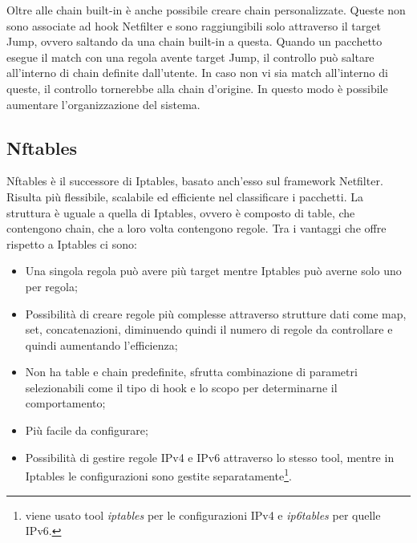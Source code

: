 Oltre alle chain built-in è anche possibile creare chain personalizzate. Queste non sono associate ad   hook Netfilter e sono raggiungibili solo attraverso il target Jump, ovvero saltando da una chain built-in a questa. Quando un pacchetto esegue il match con una regola avente target Jump, il controllo può saltare all'interno di chain definite dall'utente. In caso  non vi sia match all'interno di queste, il controllo tornerebbe alla chain d'origine. In questo modo è possibile aumentare l'organizzazione del sistema. 

\subsection{Nftables}
\label{nftables}
Nftables \cite{nftables} è il successore di Iptables, basato anch'esso sul framework Netfilter. Risulta più flessibile, scalabile ed efficiente nel classificare i pacchetti.
La struttura è uguale a quella di Iptables, ovvero è composto di table, che contengono chain, che a loro volta contengono regole.
Tra i vantaggi che offre rispetto a Iptables ci sono:
\begin{itemize}
    \item Una singola regola può avere più target mentre Iptables può averne solo uno per regola;
    \item Possibilità di creare regole più complesse attraverso strutture dati come map, set, concatenazioni, diminuendo quindi il numero di regole da controllare e quindi aumentando l'efficienza;
    \item Non ha table e chain predefinite, sfrutta combinazione di parametri selezionabili come il tipo di hook e lo scopo per determinarne il comportamento;
    \item Più facile da configurare;
    \item Possibilità di gestire regole IPv4 e IPv6   attraverso lo stesso tool, mentre in Iptables le configurazioni sono gestite separatamente\footnote{viene usato  tool \textit{iptables} per le configurazioni IPv4 e \textit{ip6tables} per quelle IPv6.}.
\end{itemize}

